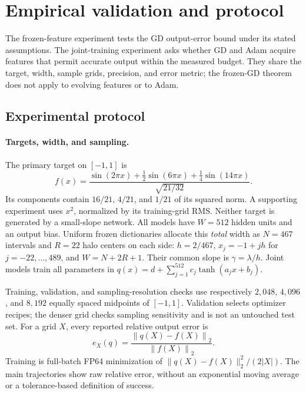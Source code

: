 \section{Empirical validation and protocol}\label{app:slope-experiments}

The frozen-feature experiment tests the GD output-error bound under its stated
assumptions. The joint-training experiment asks whether GD and Adam acquire
features that permit accurate output within the measured budget. They share
the target, width, sample grids, precision, and error metric; the frozen-GD
theorem does not apply to evolving features or to Adam.


\FloatBarrier

\FloatBarrier

\FloatBarrier

\subsection{Experimental protocol}

\paragraph{Targets, width, and sampling.}
The primary target on $[-1,1]$ is
\begin{equation}
 f(x)=\frac{\sin(2\pi x)+\tfrac12\sin(6\pi x)
                 +\tfrac14\sin(14\pi x)}{\sqrt{21/32}}.
\end{equation}
Its components contain $16/21$, $4/21$, and $1/21$ of its squared norm.
A supporting experiment uses $x^2$, normalized by its training-grid RMS.
Neither target is generated by a small-slope network.
All models have $W=512$ hidden units and an output bias. Uniform frozen
dictionaries allocate this \emph{total} width as $N=467$ intervals and
$R=22$ halo centers on each side: $h=2/467$,
$x_j=-1+jh$ for $j=-22,\ldots,489$, and $W=N+2R+1$.
Their common slope is $\gamma=\lambda/h$.
Joint models train all parameters in
$q(x)=d+\sum_{j=1}^{512}c_j\tanh(a_jx+b_j)$.

Training, validation, and sampling-resolution checks use respectively
$2{,}048$, $4{,}096$, and $8{,}192$ equally spaced midpoints of $[-1,1]$.
Validation selects optimizer recipes; the denser grid checks sampling
sensitivity and is not an untouched test set. For a grid $X$, every reported
relative output error is
\begin{equation}
 e_X(q)=\frac{\left\|q(X)-f(X)\right\|_2}{\left\|f(X)\right\|_2}.
\end{equation}
Training is full-batch FP64 minimization of
$\|q(X)-f(X)\|_2^2/(2|X|)$.
The main trajectories show raw relative error, without an exponential moving
average or a tolerance-based definition of success.

